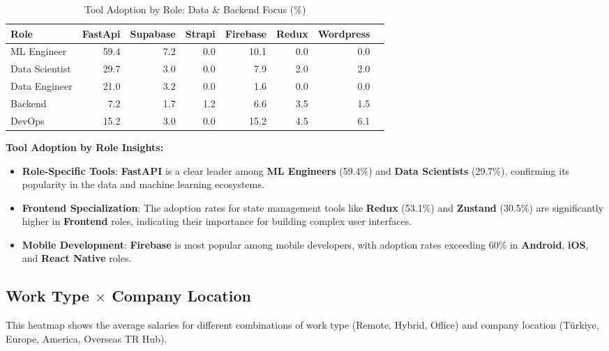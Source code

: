 \documentclass[12pt,a4paper]{article}
\begin{document}
\begin{table}[H]
    \centering
    \caption{Tool Adoption by Role: Data \& Backend Focus (\%)}
    \label{tab:tool_adoption_data_backend}
    \small
    \begin{tabular}{lrrrrrrr}
        \toprule
        \textbf{Role} & \textbf{FastApi} & \textbf{Supabase} & \textbf{Strapi} & \textbf{Firebase} & \textbf{Redux} & \textbf{Wordpress} \\
        \midrule
        ML Engineer & 59.4 & 7.2 & 0.0 & 10.1 & 0.0 & 0.0 \\
        Data Scientist & 29.7 & 3.0 & 0.0 & 7.9 & 2.0 & 2.0 \\
        Data Engineer & 21.0 & 3.2 & 0.0 & 1.6 & 0.0 & 0.0 \\
        Backend & 7.2 & 1.7 & 1.2 & 6.6 & 3.5 & 1.5 \\
        DevOps & 15.2 & 3.0 & 0.0 & 15.2 & 4.5 & 6.1 \\
        \bottomrule
    \end{tabular}
\end{table}

\textbf{Tool Adoption by Role Insights:}
\begin{itemize}
	\item \textbf{Role-Specific Tools}: \textbf{FastAPI} is a clear leader among \textbf{ML Engineers} (59.4\%) and \textbf{Data Scientists} (29.7\%), confirming its popularity in the data and machine learning ecosystems.
	\item \textbf{Frontend Specialization}: The adoption rates for state management tools like \textbf{Redux} (53.1\%) and \textbf{Zustand} (30.5\%) are significantly higher in \textbf{Frontend} roles, indicating their importance for building complex user interfaces.
	\item \textbf{Mobile Development}: \textbf{Firebase} is most popular among mobile developers, with adoption rates exceeding 60\% in \textbf{Android}, \textbf{iOS}, and \textbf{React Native} roles.
\end{itemize}

\subsection{Work Type \texorpdfstring{\(\times\)}{x} Company Location}
This heatmap shows the average salaries for different combinations of work type (Remote, Hybrid, Office) and company location (Türkiye, Europe, America, Overseas TR Hub).
\end{document}
